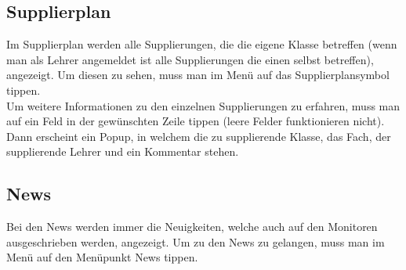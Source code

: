 \subsection{Supplierplan}
Im Supplierplan werden alle Supplierungen, die die eigene Klasse betreffen (wenn man als Lehrer angemeldet ist alle Supplierungen die einen selbst betreffen), angezeigt. Um diesen zu sehen, muss man im Menü auf das Supplierplansymbol tippen.\\
Um weitere Informationen zu den einzelnen Supplierungen zu erfahren, muss man auf ein Feld in der gewünschten Zeile tippen (leere Felder funktionieren nicht). Dann erscheint ein Popup, in welchem die zu supplierende Klasse, das Fach, der supplierende Lehrer und ein Kommentar stehen.

\subsection{News}
Bei den News werden immer die Neuigkeiten, welche auch auf den Monitoren ausgeschrieben werden,  angezeigt. Um zu den News zu gelangen, muss man im Menü auf den Menüpunkt News tippen.
